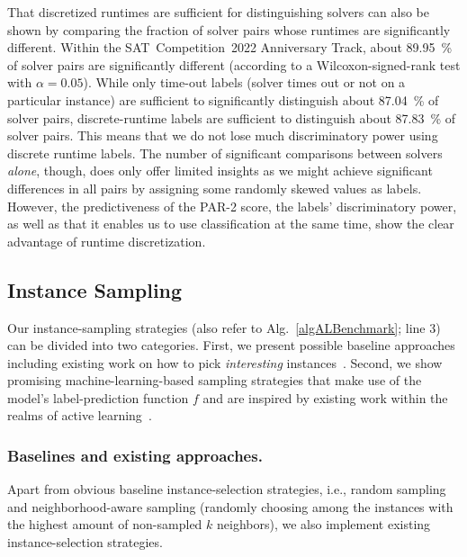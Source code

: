 \documentclass[runningheads]{llncs}
\begin{document}
That discretized runtimes are sufficient for distinguishing solvers can also be shown by comparing the fraction of solver pairs whose runtimes are significantly different.
Within the SAT~Competition~2022 Anniversary Track, about \SI{89.95}{\%} of solver pairs are significantly different (according to a Wilcoxon-signed-rank test with $\alpha = 0.05$).
While only time-out labels (solver times out or not on a particular instance) are sufficient to significantly distinguish about \SI{87.04}{\%} of solver pairs, discrete-runtime labels are sufficient to distinguish about \SI{87.83}{\%} of solver pairs.
This means that we do not lose much discriminatory power using discrete runtime labels.
The number of significant comparisons between solvers \emph{alone}, though, does only offer limited insights as we might achieve significant differences in all pairs by assigning some randomly skewed values as labels.
However, the predictiveness of the PAR-2 score, the labels' discriminatory power, as well as that it enables us to use classification at the same time, show the clear advantage of runtime discretization.


\subsection{Instance Sampling}
\label{sec:main2}
Our instance-sampling strategies (also refer to Alg.~\ref{algALBenchmark}; line 3) can be divided into two categories.
First, we present possible baseline approaches including existing work on how to pick \emph{interesting} instances~\cite{Bossek021a,GentHJKMNN14,MatriconAFSH21}.
Second, we show promising machine-learning-based sampling strategies that make use of the model's label-prediction function $f$ and are inspired by existing work within the realms of active learning~\cite{settles2009active}.

\subsubsection{Baselines and existing approaches.}
\label{sec:sampling1}
Apart from obvious baseline instance-selection strategies, i.e., random sampling and neighborhood-aware sampling (randomly choosing among the instances with the highest amount of non-sampled $k$ neighbors), we also implement existing instance-selection strategies.
\end{document}
